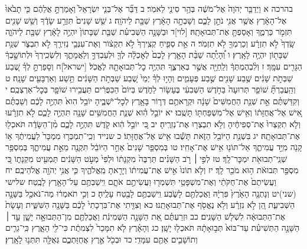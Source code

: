 \documentclass[twoside, openany, parskip=half, 11pt]{book}
\begin{document}
בהרכה א וַיְדַבֵּ֤ר יְהֹוָה֙ אֶל־מֹשֶׁ֔ה בְּהַ֥ר סִינַ֖י לֵאמֹֽר׃ ב דַּבֵּ֞ר אֶל־בְּנֵ֤י יִשְׂרָאֵל֙ וְאָמַרְתָּ֣ אֲלֵהֶ֔ם כִּ֤י תָבֹ֙אוּ֙ אֶל־הָאָ֔רֶץ אֲשֶׁ֥ר אֲנִ֖י נֹתֵ֣ן לָכֶ֑ם וְשָׁבְתָ֣ה הָאָ֔רֶץ שַׁבָּ֖ת לַיהֹוָֽה׃ ג שֵׁ֤שׁ שָׁנִים֙ תִּזְרַ֣ע שָׂדֶ֔ךָ וְשֵׁ֥שׁ שָׁנִ֖ים תִּזְמֹ֣ר כַּרְמֶ֑ךָ וְאָסַפְתָּ֖ אֶת־תְּבוּאָתָֽהּ׃ [לוי]ד וּבַשָּׁנָ֣ה הַשְּׁבִיעִ֗ת שַׁבַּ֤ת שַׁבָּתוֹן֙ יִהְיֶ֣ה לָאָ֔רֶץ שַׁבָּ֖ת לַיהֹוָ֑ה שָֽׂדְךָ֙ לֹ֣א תִזְרָ֔ע וְכַרְמְךָ֖ לֹ֥א תִזְמֹֽר׃ ה אֵ֣ת סְפִ֤יחַ קְצִֽירְךָ֙ לֹ֣א תִקְצ֔וֹר וְאֶת־עִנְּבֵ֥י נְזִירֶ֖ךָ לֹ֣א תִבְצֹ֑ר שְׁנַ֥ת שַׁבָּת֖וֹן יִהְיֶ֥ה לָאָֽרֶץ׃ ו וְ֠הָיְתָ֠ה שַׁבַּ֨ת הָאָ֤רֶץ לָכֶם֙ לְאׇכְלָ֔ה לְךָ֖ וּלְעַבְדְּךָ֣ וְלַאֲמָתֶ֑ךָ וְלִשְׂכִֽירְךָ֙ וּלְתוֹשָׁ֣בְךָ֔ הַגָּרִ֖ים עִמָּֽךְ׃ ז וְלִ֨בְהֶמְתְּךָ֔ וְלַֽחַיָּ֖ה אֲשֶׁ֣ר בְּאַרְצֶ֑ךָ תִּהְיֶ֥ה כׇל־תְּבוּאָתָ֖הּ לֶאֱכֹֽל׃
[ישראל]ח וְסָפַרְתָּ֣ לְךָ֗ שֶׁ֚בַע שַׁבְּתֹ֣ת שָׁנִ֔ים שֶׁ֥בַע שָׁנִ֖ים שֶׁ֣בַע פְּעָמִ֑ים וְהָי֣וּ לְךָ֗ יְמֵי֙ שֶׁ֚בַע שַׁבְּתֹ֣ת הַשָּׁנִ֔ים תֵּ֥שַׁע וְאַרְבָּעִ֖ים שָׁנָֽה׃ ט וְהַֽעֲבַרְתָּ֞ שׁוֹפַ֤ר תְּרוּעָה֙ בַּחֹ֣דֶשׁ הַשְּׁבִעִ֔י בֶּעָשׂ֖וֹר לַחֹ֑דֶשׁ בְּיוֹם֙ הַכִּפֻּרִ֔ים תַּעֲבִ֥ירוּ שׁוֹפָ֖ר בְּכׇל־אַרְצְכֶֽם׃ י וְקִדַּשְׁתֶּ֗ם אֵ֣ת שְׁנַ֤ת הַחֲמִשִּׁים֙ שָׁנָ֔ה וּקְרָאתֶ֥ם דְּר֛וֹר בָּאָ֖רֶץ לְכׇל־יֹשְׁבֶ֑יהָ יוֹבֵ֥ל הִוא֙ תִּהְיֶ֣ה לָכֶ֔ם וְשַׁבְתֶּ֗ם אִ֚ישׁ אֶל־אֲחֻזָּת֔וֹ וְאִ֥ישׁ אֶל־מִשְׁפַּחְתּ֖וֹ תָּשֻֽׁבוּ׃ יא יוֹבֵ֣ל הִ֗וא שְׁנַ֛ת הַחֲמִשִּׁ֥ים שָׁנָ֖ה תִּהְיֶ֣ה לָכֶ֑ם לֹ֣א תִזְרָ֔עוּ וְלֹ֤א תִקְצְרוּ֙ אֶת־סְפִיחֶ֔יהָ וְלֹ֥א תִבְצְר֖וּ אֶת־נְזִרֶֽיהָ׃ יב כִּ֚י יוֹבֵ֣ל הִ֔וא קֹ֖דֶשׁ תִּהְיֶ֣ה לָכֶ֑ם מִ֨ן־הַשָּׂדֶ֔ה תֹּאכְל֖וּ אֶת־תְּבוּאָתָֽהּ׃ יג בִּשְׁנַ֥ת הַיּוֹבֵ֖ל הַזֹּ֑את תָּשֻׁ֕בוּ אִ֖ישׁ אֶל־אֲחֻזָּתֽוֹ׃ כ שנייד וְכִֽי־תִמְכְּר֤וּ מִמְכָּר֙ לַעֲמִיתֶ֔ךָ א֥וֹ קָנֹ֖ה מִיַּ֣ד עֲמִיתֶ֑ךָ אַל־תּוֹנ֖וּ אִ֥ישׁ אֶת־אָחִֽיו׃ טו בְּמִסְפַּ֤ר שָׁנִים֙ אַחַ֣ר הַיּוֹבֵ֔ל תִּקְנֶ֖ה מֵאֵ֣ת עֲמִיתֶ֑ךָ בְּמִסְפַּ֥ר שְׁנֵֽי־תְבוּאֹ֖ת יִמְכׇּר־לָֽךְ׃ טז לְפִ֣י ׀ רֹ֣ב הַשָּׁנִ֗ים תַּרְבֶּה֙ מִקְנָת֔וֹ וּלְפִי֙ מְעֹ֣ט הַשָּׁנִ֔ים תַּמְעִ֖יט מִקְנָת֑וֹ כִּ֚י מִסְפַּ֣ר תְּבוּאֹ֔ת ה֥וּא מֹכֵ֖ר לָֽךְ׃ יז וְלֹ֤א תוֹנוּ֙ אִ֣ישׁ אֶת־עֲמִית֔וֹ וְיָרֵ֖אתָ מֵֽאֱלֹהֶ֑יךָ כִּ֛י אֲנִ֥י יְהֹוָ֖ה אֱלֹהֵיכֶֽם׃ יח וַעֲשִׂיתֶם֙ אֶת־חֻקֹּתַ֔י וְאֶת־מִשְׁפָּטַ֥י תִּשְׁמְר֖וּ וַעֲשִׂיתֶ֣ם אֹתָ֑ם וִֽישַׁבְתֶּ֥ם עַל־הָאָ֖רֶץ לָבֶֽטַח׃ שלישי (שני)יט וְנָתְנָ֤ה הָאָ֙רֶץ֙ פִּרְיָ֔הּ וַאֲכַלְתֶּ֖ם לָשֹׂ֑בַע וִֽישַׁבְתֶּ֥ם לָבֶ֖טַח עָלֶֽיהָ׃ כ וְכִ֣י תֹאמְר֔וּ מַה־נֹּאכַ֖ל בַּשָּׁנָ֣ה הַשְּׁבִיעִ֑ת הֵ֚ן לֹ֣א נִזְרָ֔ע וְלֹ֥א נֶאֱסֹ֖ף אֶת־תְּבוּאָתֵֽנוּ׃ כא וְצִוִּ֤יתִי אֶת־בִּרְכָתִי֙ לָכֶ֔ם בַּשָּׁנָ֖ה הַשִּׁשִּׁ֑ית וְעָשָׂת֙ אֶת־הַתְּבוּאָ֔ה לִשְׁלֹ֖שׁ הַשָּׁנִֽים׃ כב וּזְרַעְתֶּ֗ם אֵ֚ת הַשָּׁנָ֣ה הַשְּׁמִינִ֔ת וַאֲכַלְתֶּ֖ם מִן־הַתְּבוּאָ֣ה יָשָׁ֑ן עַ֣ד ׀ הַשָּׁנָ֣ה הַתְּשִׁיעִ֗ת עַד־בּוֹא֙ תְּב֣וּאָתָ֔הּ תֹּאכְל֖וּ יָשָֽׁן׃ כג וְהָאָ֗רֶץ לֹ֤א תִמָּכֵר֙ לִצְמִתֻ֔ת כִּי־לִ֖י הָאָ֑רֶץ כִּֽי־גֵרִ֧ים וְתוֹשָׁבִ֛ים אַתֶּ֖ם עִמָּדִֽי׃ כד וּבְכֹ֖ל אֶ֣רֶץ אֲחֻזַּתְכֶ֑ם גְּאֻלָּ֖ה תִּתְּנ֥וּ לָאָֽרֶץ׃
\end{document}
